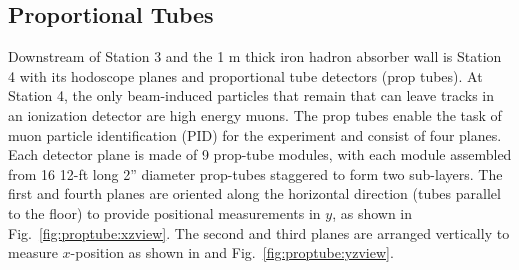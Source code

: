 \subsection{Proportional Tubes}

Downstream of Station 3 and the 1 m thick iron hadron absorber wall is Station 4 with its hodoscope planes and proportional tube  detectors (prop tubes). At Station 4, the only beam-induced particles that remain that can leave tracks in an ionization detector are high energy muons. The prop tubes enable the task of muon particle identification (PID) for the experiment and consist of four planes. Each detector plane is made of 9 prop-tube modules, with each module assembled from 16 12-ft long 2'' diameter prop-tubes staggered to form two sub-layers. The first and fourth planes are oriented along the horizontal direction (tubes parallel to the floor) to provide positional measurements in $y$, as shown in Fig.~\ref{fig:proptube:xzview}. The second and third planes are arranged vertically to measure $x$-position as shown in and Fig.~\ref{fig:proptube:yzview}.

